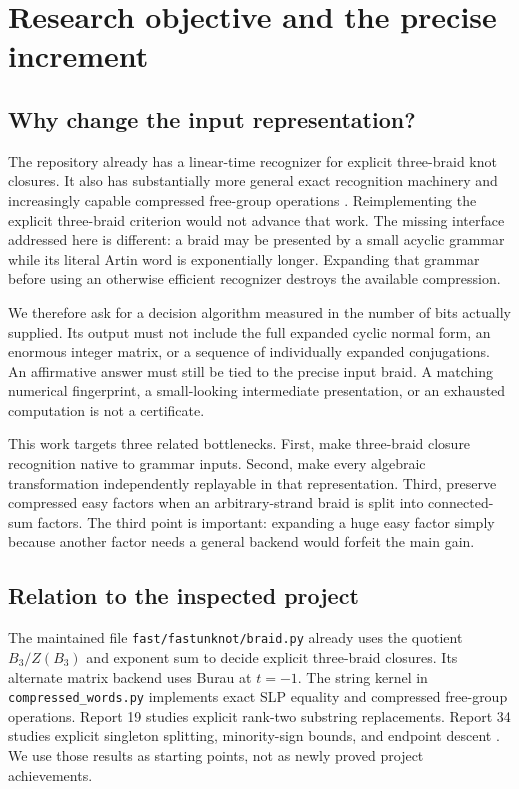 \documentclass[11pt,letterpaper]{article}
\theoremstyle{definition}\newtheorem{definition}[theorem]{Definition}
\theoremstyle{remark}\newtheorem{remark}[theorem]{Remark}
\begin{document}
\section{Research objective and the precise increment}
\subsection{Why change the input representation?}
The repository already has a linear-time recognizer for explicit three-braid knot closures. It also has substantially more general exact recognition machinery and increasingly capable compressed free-group operations \cite{repo}. Reimplementing the explicit three-braid criterion would not advance that work. The missing interface addressed here is different: a braid may be presented by a small acyclic grammar while its literal Artin word is exponentially longer. Expanding that grammar before using an otherwise efficient recognizer destroys the available compression.

We therefore ask for a decision algorithm measured in the number of bits actually supplied. Its output must not include the full expanded cyclic normal form, an enormous integer matrix, or a sequence of individually expanded conjugations. An affirmative answer must still be tied to the precise input braid. A matching numerical fingerprint, a small-looking intermediate presentation, or an exhausted computation is not a certificate.

This work targets three related bottlenecks. First, make three-braid closure recognition native to grammar inputs. Second, make every algebraic transformation independently replayable in that representation. Third, preserve compressed easy factors when an arbitrary-strand braid is split into connected-sum factors. The third point is important: expanding a huge easy factor simply because another factor needs a general backend would forfeit the main gain.

\subsection{Relation to the inspected project}
The maintained file \texttt{fast/fastunknot/braid.py} already uses the quotient $B_3/Z(B_3)$ and exponent sum to decide explicit three-braid closures. Its alternate matrix backend uses Burau at $t=-1$. The string kernel in \texttt{compressed\_words.py} implements exact SLP equality and compressed free-group operations. Report 19 studies explicit rank-two substring replacements. Report 34 studies explicit singleton splitting, minority-sign bounds, and endpoint descent \cite{repo,ranktwo,minority}. We use those results as starting points, not as newly proved project achievements.
\end{document}
